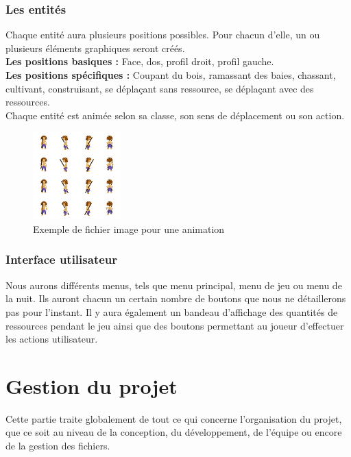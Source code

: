 \documentclass[a4paper]{memoir}
\begin{document}
			\subsection{Les entités}
				Chaque entité aura plusieurs positions possibles. Pour chacun d'elle, un ou plusieurs éléments graphiques seront créés.\\
				\textbf{Les positions basiques :} Face, dos, profil droit, profil gauche.\\
				\textbf{Les positions spécifiques :} Coupant du bois, ramassant des baies, chassant, cultivant, construisant, se déplaçant sans ressource, se déplaçant avec des ressources.\\
				Chaque entité est animée selon sa classe, son sens de déplacement ou son action.\\
				\begin{figure}[H]
					\begin{center}
						\includegraphics[scale=1]{img/animationSample.png}
					\end{center}
					\label{fig:animationSample}
					\caption{Exemple de fichier image pour une animation}
				\end{figure}
	
			\subsection{Interface utilisateur}
				Nous aurons différents menus, tels que menu principal, menu de jeu ou menu de la nuit. Ils auront chacun un certain nombre de boutons que nous ne détaillerons pas pour l'instant. Il y aura également un bandeau d'affichage des quantités de ressources pendant le jeu ainsi que des boutons permettant au joueur d'effectuer les actions utilisateur.
		
	\chapter{Gestion du projet}
		Cette partie traite globalement de tout ce qui concerne l'organisation du projet, que ce soit au niveau de la conception, du développement, de l'équipe ou encore de la gestion des fichiers.
		
\end{document}
